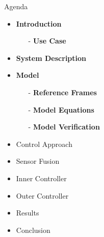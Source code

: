 \begin{frame}{Agenda}{}
    \begin{itemize}
        \item \textbf{Introduction}
        \begin{itemize}
            \item[-] \textbf{Use Case}
        \end{itemize}
        \item \textbf{System Description}
        \item \textbf{Model}
        \begin{itemize}
             \item[-] \textbf{Reference Frames}
             \item[-] \textbf{Model Equations}
             \item[-] \textbf{Model Verification}
        \end{itemize}
        \item Control Approach
        \item Sensor Fusion
        \item Inner Controller
        \item Outer Controller
        \item Results
        \item Conclusion
    \end{itemize}
\end{frame}